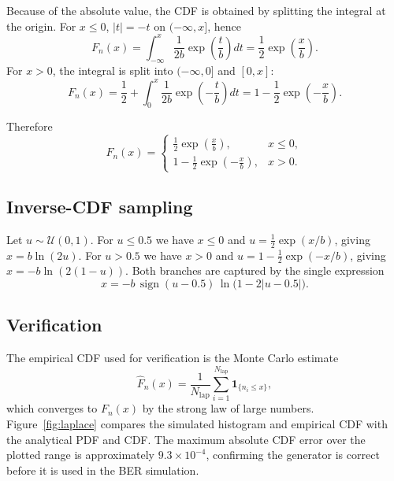 \documentclass[12pt,a4paper]{article}
\begin{document}
Because of the absolute value, the CDF is obtained by splitting the integral at the origin. For $x\le 0$, $|t|=-t$ on $(-\infty,x]$, hence
\begin{equation}
    F_n(x)=\int_{-\infty}^{x}\frac{1}{2b}\exp\!\left(\frac{t}{b}\right)dt
          =\frac{1}{2}\exp\!\left(\frac{x}{b}\right).
\end{equation}
For $x>0$, the integral is split into $(-\infty,0]$ and $[0,x]$:
\begin{equation}
    F_n(x)=\frac{1}{2}+\int_{0}^{x}\frac{1}{2b}\exp\!\left(-\frac{t}{b}\right)dt
          =1-\frac{1}{2}\exp\!\left(-\frac{x}{b}\right).
\end{equation}

Therefore
\begin{equation}
    F_n(x)=
    \begin{cases}
        \frac{1}{2}\exp\!\left(\frac{x}{b}\right), & x\le 0,\\[0.5em]
        1-\frac{1}{2}\exp\!\left(-\frac{x}{b}\right), & x>0.
    \end{cases}
\end{equation}

\subsection{Inverse-CDF sampling}
Let $u\sim\mathcal{U}(0,1)$. For $u\le 0.5$ we have $x\le 0$ and $u=\frac{1}{2}\exp(x/b)$, giving $x=b\ln(2u)$. For $u>0.5$ we have $x>0$ and $u=1-\frac{1}{2}\exp(-x/b)$, giving $x=-b\ln(2(1-u))$. Both branches are captured by the single expression
\begin{equation}
    x=-b\,\operatorname{sign}(u-0.5)\,\ln\bigl(1-2|u-0.5|\bigr).
\end{equation}

\subsection{Verification}
The empirical CDF used for verification is the Monte Carlo estimate
\begin{equation}
    \hat{F}_n(x)=\frac{1}{N_{\text{lap}}}\sum_{i=1}^{N_{\text{lap}}}\mathbf{1}_{\{n_i\le x\}},
\end{equation}
which converges to $F_n(x)$ by the strong law of large numbers. Figure~\ref{fig:laplace} compares the simulated histogram and empirical CDF with the analytical PDF and CDF. The maximum absolute CDF error over the plotted range is approximately $9.3\times 10^{-4}$, confirming the generator is correct before it is used in the BER simulation.
\end{document}
